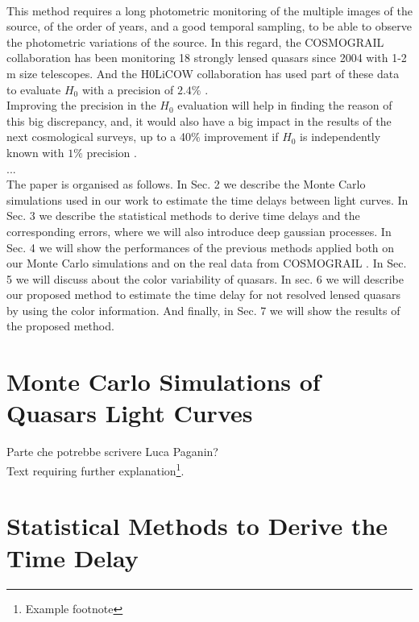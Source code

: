 \documentclass[twoside,twocolumn]{article}
\begin{document}
\\
This method requires a long photometric monitoring of the multiple images of the source, of the order of years, and a good temporal sampling, to be able to observe the photometric variations of the source. In this regard, the COSMOGRAIL \cite{Cosmograil2020} collaboration has been monitoring 18 strongly lensed quasars since 2004  with 1-2 m size telescopes. And the H0LiCOW collaboration has used part of these data to evaluate $H_0$ with a precision of $2.4\%$ \cite{H0licow_XIII}. 
\\
Improving the precision in the $H_0$ evaluation will help in finding the reason of this big discrepancy, and, it would also have a big impact in the results of the next cosmological surveys, up to a 40$\%$ improvement if $H_0$ is independently known with $1\%$ precision \cite{Weinberg2013}.
\\
...
\\
The paper is organised as follows. In Sec. 2 we describe the Monte Carlo simulations used in our work to estimate the time delays between light curves. In Sec. 3 we describe the statistical methods to derive time delays and the corresponding errors, where we will also introduce deep gaussian processes. In Sec. 4 we will show the performances of the previous methods applied both on our Monte Carlo simulations and on the real data from COSMOGRAIL \cite{Cosmograil2020}. In Sec. 5 we will discuss about the color variability of quasars. In sec. 6 we will describe our proposed method to estimate the time delay for not resolved lensed quasars by using the color information. And finally, in Sec. 7 we will show the results of the proposed method.



\section{Monte Carlo Simulations of Quasars Light Curves}

Parte che potrebbe scrivere Luca Paganin?
\\
Text requiring further explanation\footnote{Example footnote}.


\section{Statistical Methods to Derive the Time Delay}
\end{document}
